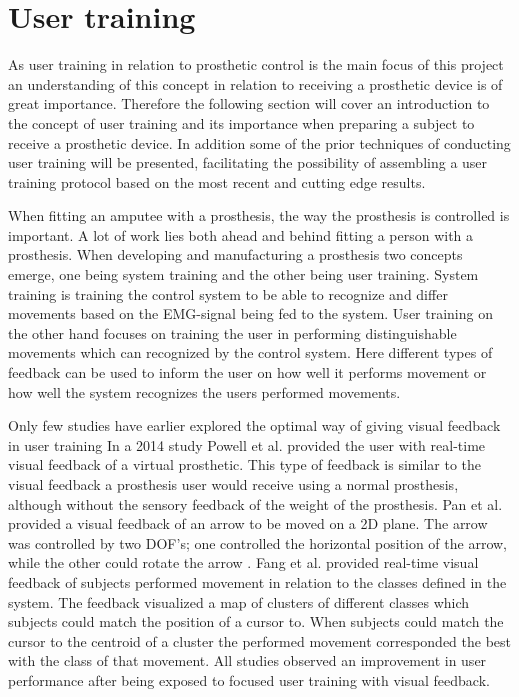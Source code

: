 
\section{User training}

As user training in relation to prosthetic control is the main focus of this project an understanding of this concept in relation to receiving a prosthetic device is of great importance. Therefore the following section will cover an introduction to the concept of user training and its importance when preparing a subject to receive a prosthetic device. In addition some of the prior techniques of conducting user training will be presented, facilitating the possibility of assembling a user training protocol based on the most recent and cutting edge results.   

When fitting an amputee with a prosthesis, the way the prosthesis is controlled is important. A lot of work lies both ahead and behind fitting a person with a prosthesis. When developing and manufacturing a prosthesis two concepts emerge, one being system training and the other being user training. System training is training the control system to be able to recognize and differ movements based on the EMG-signal being fed to the system. \cite{Fougner2012} User training on the other hand focuses on training the user in performing distinguishable movements which can recognized by the control system. Here different types of feedback can be used to inform the user on how well it performs movement or how well the system recognizes the users performed movements. \cite{Powell2014,Simon2013}


Only few studies have earlier explored the optimal way of giving visual feedback in user training \cite{Jiang2012}
In a 2014 study Powell et al. \cite{Powell2014} provided the user with real-time visual feedback of a virtual prosthetic. This type of feedback is similar to the visual feedback a prosthesis user would receive using a normal prosthesis, although without the sensory feedback of the weight of the prosthesis. Pan et al. \cite{Pan2017} provided a visual feedback of an arrow to be moved on a 2D plane. The arrow was controlled by two DOF's; one controlled the horizontal position of the arrow, while the other could rotate the arrow \cite{Pan2017}. Fang et al. \cite{Fang2017} provided real-time visual feedback of subjects performed movement in relation to the classes defined in the system. The feedback visualized a map of clusters of different classes which subjects could match the position of a cursor to. When subjects could match the cursor to the centroid of a cluster the performed movement corresponded the best with the class of that movement. \cite{Fang2017} All studies observed an improvement in user performance after being exposed to focused user training with visual feedback. 
